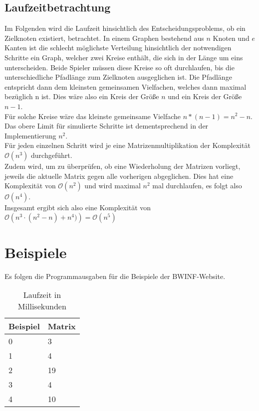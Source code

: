 \subsection{Laufzeitbetrachtung}\label{subsec:laufzeitbetrachtung}
Im Folgenden wird die Laufzeit hinsichtlich des Entscheidungsproblems, ob ein Zielknoten existiert, betrachtet.
In einem Graphen bestehend aus $n$ Knoten und $e$ Kanten ist die schlecht möglichste Verteilung hinsichtlich der notwendigen Schritte
ein Graph, welcher zwei Kreise enthält, die sich in der Länge um eins unterscheiden.
Beide Spieler müssen diese Kreise so oft durchlaufen, bis die unterschiedliche Pfadlänge zum Zielknoten ausgeglichen ist.
Die Pfadlänge entspricht dann dem kleinsten gemeinsamen Vielfachen, welches dann maximal bezüglich n ist.
Dies wäre also ein Kreis der Größe $n$ und ein Kreis der Größe $n - 1$. \\
Für solche Kreise wäre das kleinste gemeinsame Vielfache $n * \left(n - 1\right) = n^2 - n$. \\
Das obere Limit für simulierte Schritte ist dementsprechend in der Implementierung $n^2$. \\
Für jeden einzelnen Schritt wird je eine Matrizenmultiplikation der Komplexität $\mathcal{O}(n^3)$ durchgeführt. \\
Zudem wird, um zu überprüfen, ob eine Wiederholung der Matrizen vorliegt, jeweils die aktuelle Matrix gegen alle vorherigen abgeglichen.
Dies hat eine Komplexität von $\mathcal{O}\left(n^2\right)$ und wird
maximal $n^2$ mal durchlaufen, es folgt also $\mathcal{O}\left(n^4\right)$. \\
Insgesamt ergibt sich also eine Komplexität von $\mathcal{O}\left(n^3 \cdot \left(n^2 - n\right) + n^4)\right) = \mathcal{O}\left(n^5\right)$


\section{Beispiele}\label{sec:beispiele}
Es folgen die Programmausgaben für die Beispiele der BWINF-Website. \\
\begin{table}[h]
    \centering
    \begin{tabular}{|l|l|}
        \hline
        Beispiel & Matrix \\ \hline
        0        & 3      \\ \hline
        1        & 4      \\ \hline
        2        & 19     \\ \hline
        3        & 4      \\ \hline
        4        & 10     \\ \hline
    \end{tabular}
    \caption{Laufzeit in Millisekunden}
    \label{tab:my-table}
\end{table}

